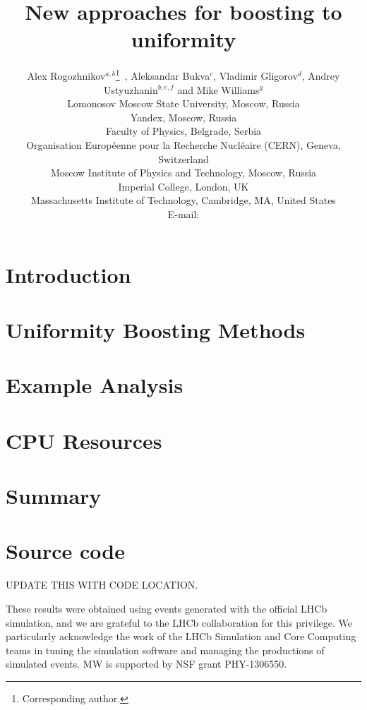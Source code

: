 \documentclass{JINST}
\title{New approaches for boosting to uniformity}
\author{
Alex Rogozhnikov$^{a,b}$\thanks{Corresponding author.}~,
Aleksandar Bukva$^c$, 
Vladimir Gligorov$^d$,
Andrey Ustyuzhanin$^{b,e,f}$ and
Mike Williams$^g$\\
\llap{$^a$}Lomonosov Moscow State University, Moscow, Russia\\
\llap{$^b$}Yandex, Moscow, Russia\\
\llap{$^c$}Faculty of Physics, Belgrade, Serbia \\
\llap{$^d$}Organisation Europ\'eenne pour la Recherche Nucl\'eaire (CERN), Geneva, Switzerland  \\
\llap{$^e$}Moscow Institute of Physics and Technology, Moscow, Russia\\
\llap{$^f$}Imperial College, London, UK\\
\llap{$^g$}Massachusetts Institute of Technology, Cambridge, MA, United States \\
E-mail: \email{alex.rogozhnikov@yandex.ru}}
\theoremstyle{definition}
\theoremstyle{remark}
\begin{document}
\maketitle


\section{Introduction}



\section{Uniformity Boosting Methods}


\section{Example Analysis}




\section{CPU Resources}



\section{Summary}



\section{Source code}

UPDATE THIS WITH CODE LOCATION.

\acknowledgments

These results were obtained using events generated with the official LHCb simulation, and we are grateful to the LHCb collaboration for this privilege. 
We particularly acknowledge the work of the LHCb Simulation and Core Computing teams in tuning the simulation software and managing the productions of simulated events.
MW is supported by NSF grant PHY-1306550.
\end{document}
